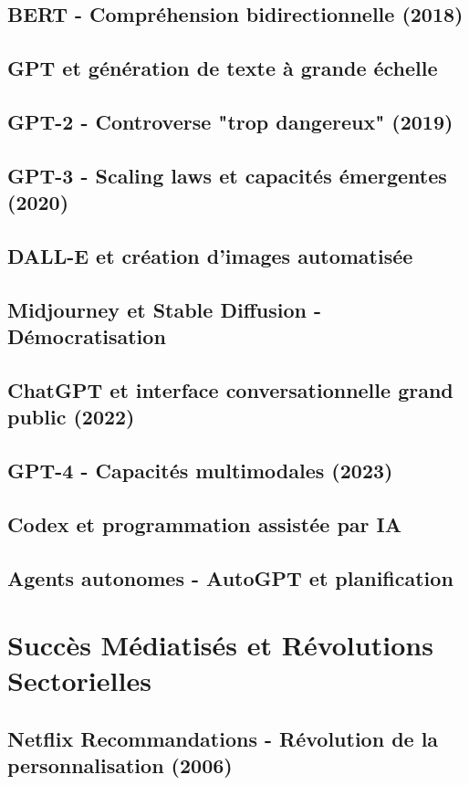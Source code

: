 \documentclass[12pt,a4paper]{book}
\begin{document}
\section{BERT - Compréhension bidirectionnelle (2018)}
\section{GPT et génération de texte à grande échelle}
\section{GPT-2 - Controverse "trop dangereux" (2019)}
\section{GPT-3 - Scaling laws et capacités émergentes (2020)}
\section{DALL-E et création d'images automatisée}
\section{Midjourney et Stable Diffusion - Démocratisation}
\section{ChatGPT et interface conversationnelle grand public (2022)}
\section{GPT-4 - Capacités multimodales (2023)}
\section{Codex et programmation assistée par IA}
\section{Agents autonomes - AutoGPT et planification}

\chapter{Succès Médiatisés et Révolutions Sectorielles}
\section{Netflix Recommandations - Révolution de la personnalisation (2006)}
\end{document}
